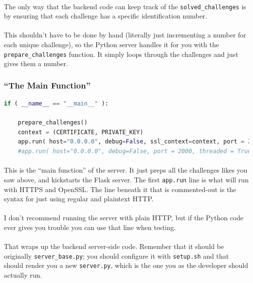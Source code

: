 \documentclass[11pt]{article}
\begin{document}
	\paragraph{} The only way that the backend code can keep track of the \texttt{solved\_challenges} is by ensuring that each challenge has a specific identification number.

	\paragraph{} This shouldn't have to be done by hand (literally just incrementing a number for each unique challenge), so the Python server handles it for you with the \texttt{prepare\_challenges} function. It simply loops through the challenges and just gives them a number. 

	\subsubsection{``The Main Function''}

\begin{lstlisting}[language=Python]
if ( __name__ == "__main__" ):

	prepare_challenges()
	context = (CERTIFICATE, PRIVATE_KEY)
	app.run( host="0.0.0.0", debug=False, ssl_context=context, port = 2000, threaded = True )
	#app.run( host="0.0.0.0", debug=False, port = 2000, threaded = True )
\end{lstlisting}


	\paragraph{} This is the ``main function'' of the server. It just preps all the challenges likes you saw above, and kickstarts the Flask server. The first \texttt{app.run} line is what will run with HTTPS and OpenSSL. The line beneath it that is commented-out is the syntax for just using regular and plaintext HTTP.

	\paragraph{} I don't recommend running the server with plain HTTP, but if the Python code ever gives you trouble you can use that line when testing. 

	\paragraph{} That wraps up the backend server-side code. Remember that it should be originally \texttt{server\_base.py}; you should configure it with \texttt{setup.sh} and that should render you a new \texttt{server.py}, which is the one you as the developer should actually run.
\end{document}
